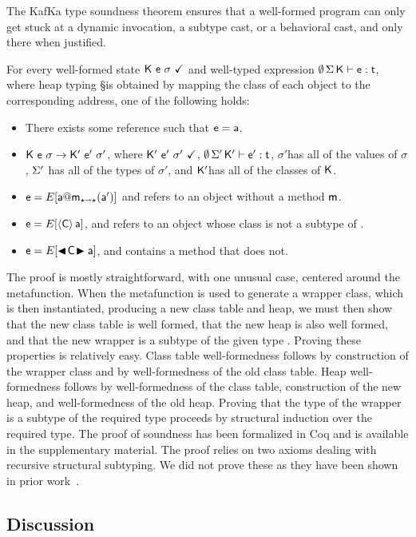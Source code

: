 \documentclass[a4paper,USenglish]{lipics-v2018}
\makeatletter
\newcommand{\EM}[1]{\ensuremath{#1}\xspace}
\newcommand{\xt}[1]{{\sf{#1}}}
\newcommand{\EMxt}[1]{\EM{\xt{#1}}}
\newcommand{\m}{\EMxt m}
\newcommand{\s}{\EM{\sigma}}
\newcommand{\K}{\EMxt K}
\newcommand{\Kp}{{\EMxt{K'}}}
\renewcommand{\sp}{{{\EM{\s'}}}}
\newcommand{\any}{\EM{\star}}
\newcommand{\DynCall}[3]{\EM{#1@#2_{\any\shortrightarrow\any}(#3)}}
\newcommand{\SubCast}[2]{\EM{\langle{#1}\rangle\,{#2}}}
\newcommand{\BehStart}{\EM{\blacktriangleleft}}
\newcommand{\BehEnd}{\EM{\blacktriangleright}}
\newcommand{\BehCast}[2]{\EM{\BehStart\! #1\! \BehEnd #2}}
\newcommand{\Red}{\EM{\rightarrow}}
\newcommand{\OK}{\EM{~\checkmark}}
\newcommand{\EnvType}[5]{ \EM{#1\,#2\,#3\vdash #4 : #5}}
\newcommand{\WFq}[1]{#1\OK}
\newcommand{\kafka}{{\sf KafKa}\xspace}
\newcounter{theo}
\newcounter{lem}
\makeatother
\begin{document}
The \kafka type soundness theorem ensures that a well-formed program can
only get stuck at a dynamic invocation, a subtype cast, or a behavioral
cast, and only there when justified.

\begin{theorem}[\kafka type soundness]
For every well-formed state $\WFq{\K~\e~\s}$ and well-typed
expression $\EnvType\emptyset\S\K\e\t$, where heap typing \S is obtained by
mapping the class of each object to the corresponding address, one of the
following holds:
\newcommand{\Sp}{\EM{\S'}\xspace}
\begin{itemize}
\item There exists some reference \a such that $\e = \a$.
\item $\K~\e~\s\Red\Kp~\ep~\sp$, where $\WFq{\Kp~\ep~\sp}$,
\EnvType\emptyset\Sp\Kp\ep\t, \sp has all of the values of \s, \Sp has all of the
types of \sp, and \Kp has all of the classes of \K.
\item $\e=E[\DynCall\a\m\ap]$ and \a refers to an object without a method \m.
\item $\e=E[\SubCast\C\a]$, and \a refers to an object whose class is not
a subtype of \C.
\item $\e=E[\BehCast\C\a]$, and \C contains a method that \a does not.
\end{itemize}
\end{theorem}
The proof is mostly straightforward, with one unusual case, centered around
the \xt{bcast} metafunction. When the \xt{bcast} metafunction is used to
generate a wrapper class, which is then instantiated, producing a new class
table and heap, we must then show that the new class table is well formed,
that the new heap is also well formed, and that the new wrapper is a subtype
of the given type \C. Proving these properties is relatively easy. Class
table well-formedness follows by construction of the wrapper class and by
well-formedness of the old class table. Heap well-formedness follows by
well-formedness of the class table, construction of the new heap, and
well-formedness of the old heap. Proving that the type of the wrapper is a
subtype of the required type proceeds by structural induction over the
required type. The proof of soundness has been formalized in Coq and is
available in the supplementary material. The proof relies on two axioms
dealing with recursive structural subtyping. We did not prove these as
they have been shown in prior work~\cite{JonesStructural}.

\subsection{Discussion}
\end{document}
